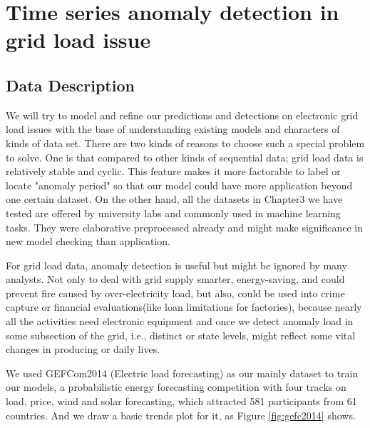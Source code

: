 
\chapter{Time series anomaly detection in grid load issue} %

\label{Chapter4} %
\setlength{\parindent}{0pt}

\section{Data Description}
We will try to model and refine our predictions and detections on electronic grid load issues with the base of understanding existing models and characters of kinds of data set. There are two kinds of reasons to choose such a special problem to solve. One is that compared to other kinds of sequential data; grid load data is relatively stable and cyclic. This feature makes it more factorable to label or locate "anomaly period" so that our model could have more application beyond one certain dataset. On the other hand, all the datasets in Chapter3 we have tested are offered by university labs and commonly used in machine learning tasks. They were elaborative preprocessed already and might make significance in new model checking than application. 

For grid load data, anomaly detection is useful but might be ignored by many analysts. Not only to deal with grid supply smarter, energy-saving, and could prevent fire caused by over-electricity load, but also, could be used into crime capture or financial evaluations(like loan limitations for factories), because nearly all the activities need electronic equipment and once we detect anomaly load in some subsection of the grid, i.e., distinct or state levels, might reflect some vital changes in producing or daily lives. 

We used GEFCom2014 (Electric load forecasting) as our mainly dataset to train our models, a probabilistic energy forecasting competition with four tracks on load, price, wind and solar forecasting, which attracted 581 participants from 61 countries. And we draw a basic trends plot for it, as Figure \ref{fig:gefc2014} shows.


